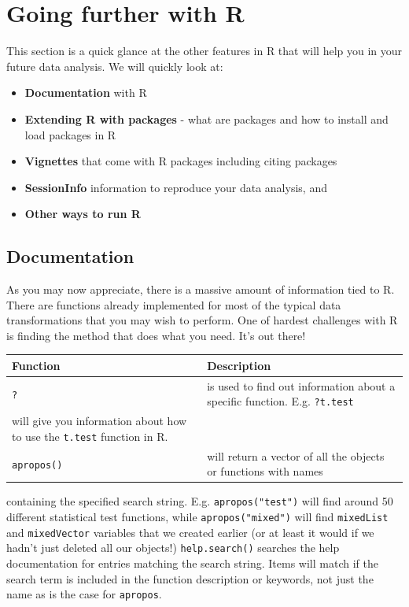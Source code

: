 \documentclass[a4paper]{book}
\providecommand{\tightlist}{%
  \setlength{\itemsep}{0pt}\setlength{\parskip}{0pt}}
\begin{document}
\chapter{Going further with R}\label{going-further-with-r}

This section is a quick glance at the other features in R that will help
you in your future data analysis. We will quickly look at:

\begin{itemize}
\tightlist
\item
  \textbf{Documentation} with R
\item
  \textbf{Extending R with packages} - what are packages and how to
  install and load packages in R
\item
  \textbf{Vignettes} that come with R packages including citing packages
\item
  \textbf{SessionInfo} information to reproduce your data analysis, and
\item
  \textbf{Other ways to run R}
\end{itemize}

\section{Documentation}\label{documentation}

As you may now appreciate, there is a massive amount of information tied
to R. There are functions already implemented for most of the typical
data transformations that you may wish to perform. One of hardest
challenges with R is finding the method that does what you need. It's
out there!

\begin{longtable}[]{@{}ll@{}}
\toprule
Function & Description\tabularnewline
\midrule
\endhead
\texttt{?} & is used to find out information about a specific function.
E.g. \texttt{?t.test}\tabularnewline
will give you information about how to use the \texttt{t.test} function
in R. &\tabularnewline
\texttt{apropos()} & will return a vector of all the objects or
functions with names\tabularnewline
\bottomrule
\end{longtable}

containing the specified search string. E.g. \texttt{apropos("test")}
will find around 50 different statistical test functions, while
\texttt{apropos("mixed")} will find \texttt{mixedList} and
\texttt{mixedVector} variables that we created earlier (or at least it
would if we hadn't just deleted all our objects!) \textbar{} \textbar{}
\texttt{help.search()} \textbar{} searches the help documentation for
entries matching the search string. Items will match if the search term
is included in the function description or keywords, not just the name
as is the case for \texttt{apropos}. \textbar{}
\end{document}
